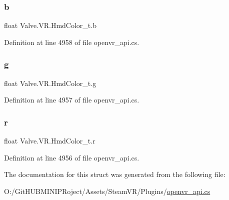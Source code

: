 \mbox{\label{struct_valve_1_1_v_r_1_1_hmd_color__t_aa1f060f53f7deb971c8ba3c647dde469}} 
\subsubsection{\texorpdfstring{b}{b}}
{\footnotesize\ttfamily float Valve.\+V\+R.\+Hmd\+Color\+\_\+t.\+b}



Definition at line 4958 of file openvr\+\_\+api.\+cs.

\mbox{\label{struct_valve_1_1_v_r_1_1_hmd_color__t_adc5207bc59ae0991b566472dcdd5f8dd}} 
\subsubsection{\texorpdfstring{g}{g}}
{\footnotesize\ttfamily float Valve.\+V\+R.\+Hmd\+Color\+\_\+t.\+g}



Definition at line 4957 of file openvr\+\_\+api.\+cs.

\mbox{\label{struct_valve_1_1_v_r_1_1_hmd_color__t_a617020cac96be8efd3e426028026e214}} 
\subsubsection{\texorpdfstring{r}{r}}
{\footnotesize\ttfamily float Valve.\+V\+R.\+Hmd\+Color\+\_\+t.\+r}



Definition at line 4956 of file openvr\+\_\+api.\+cs.



The documentation for this struct was generated from the following file\+:\begin{DoxyCompactItemize}
\item 
O\+:/\+Git\+H\+U\+B\+M\+I\+N\+I\+P\+Roject/\+Assets/\+Steam\+V\+R/\+Plugins/\mbox{\hyperlink{openvr__api_8cs}{openvr\+\_\+api.\+cs}}\end{DoxyCompactItemize}
